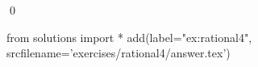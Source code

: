 
\begin{ex} 
  \label{ex:rational4}
  
  \qed
\end{ex} 
\begin{python0}
from solutions import *
add(label="ex:rational4",
    srcfilename='exercises/rational4/answer.tex') 
\end{python0}
